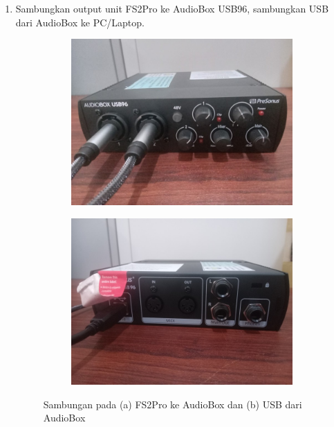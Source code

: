 \documentclass{article}
\begin{document}
\begin{enumerate}
		\item Sambungkan output unit FS2Pro ke AudioBox USB96, sambungkan USB dari AudioBox ke PC/Laptop.

		\begin{figure}[H]
			\centering
			\begin{subfigure}[]{.45\textwidth}
				\includegraphics[width=\textwidth]{images/fspro/setup2}
				\caption{}
			\end{subfigure}
			\begin{subfigure}[]{.45\textwidth}
				\includegraphics[width=\textwidth]{images/fspro/setup3}
				\caption{}
			\end{subfigure}
			\caption{Sambungan pada (a) FS2Pro ke AudioBox dan (b) USB dari AudioBox}
			\label{fig:Setup Unit AudioBox USB96}
		\end{figure}


\end{enumerate}
\end{document}
